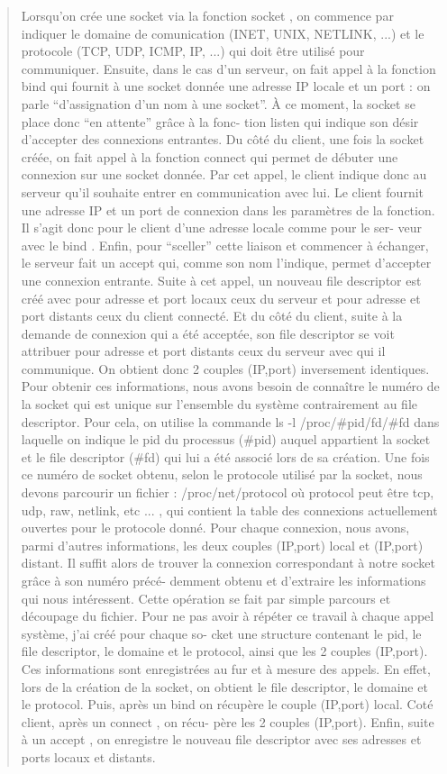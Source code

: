 \documentclass{article}
\begin{document}
\begin{quotation}
{\color{green} Lorsqu’on crée une socket via la fonction socket , on commence
  par indiquer le domaine de comunication (INET, UNIX, NETLINK, ...) et le
  protocole (TCP, UDP, ICMP, IP, ...) qui doit être utilisé pour
  communiquer. Ensuite, dans le cas d’un serveur, on fait appel à la fonction
  bind qui fournit à une socket donnée une adresse IP locale et un port : on
  parle “d’assignation d’un nom à une socket”. À ce moment, la socket se place
  donc “en attente” grâce à la fonc- tion listen qui indique son désir
  d’accepter des connexions entrantes. Du côté du client, une fois la socket
  créée, on fait appel à la fonction connect qui permet de débuter une connexion
  sur une socket donnée. Par cet appel, le client indique donc au serveur qu’il
  souhaite entrer en communication avec lui. Le client fournit une adresse IP et
  un port de connexion dans les paramètres de la fonction. Il s’agit donc pour
  le client d’une adresse locale comme pour le ser- veur avec le bind . Enfin,
  pour “sceller” cette liaison et commencer à échanger, le serveur fait un
  accept qui, comme son nom l’indique, permet d’accepter une connexion
  entrante. Suite à cet appel, un nouveau file descriptor est créé avec pour
  adresse et port locaux ceux du serveur et pour adresse et port distants ceux
  du client connecté. Et du côté du client, suite à la demande de connexion qui
  a été acceptée, son file descriptor se voit attribuer pour adresse et port
  distants ceux du serveur avec qui il communique. On obtient donc 2 couples
  (IP,port) inversement identiques.  Pour obtenir ces informations, nous avons
  besoin de connaître le numéro de la socket qui est unique sur l’ensemble du
  système contrairement au file descriptor. Pour cela, on utilise la commande ls
  -l /proc/\#pid/fd/\#fd dans laquelle on indique le pid du processus (\#pid)
  auquel appartient la socket et le file descriptor (\#fd) qui lui a été associé
  lors de sa création. Une fois ce numéro de socket obtenu, selon le protocole
  utilisé par la socket, nous devons parcourir un fichier : /proc/net/protocol
  où protocol peut être tcp, udp, raw, netlink, etc ... , qui contient la table
  des connexions actuellement ouvertes pour le protocole donné. Pour chaque
  connexion, nous avons, parmi d’autres informations, les deux couples (IP,port)
  local et (IP,port) distant. Il suffit alors de trouver la connexion
  correspondant à notre socket grâce à son numéro précé- demment obtenu et
  d’extraire les informations qui nous intéressent. Cette opération se fait par
  simple parcours et découpage du fichier.  Pour ne pas avoir à répéter ce
  travail à chaque appel système, j’ai créé pour chaque so- cket une structure
  contenant le pid, le file descriptor, le domaine et le protocol, ainsi que les
  2 couples (IP,port). Ces informations sont enregistrées au fur et à mesure des
  appels. En effet, lors de la création de la socket, on obtient le file
  descriptor, le domaine et le protocol. Puis, après un bind on récupère le
  couple (IP,port) local. Coté client, après un connect , on récu- père les 2
  couples (IP,port). Enfin, suite à un accept , on enregistre le nouveau file
  descriptor avec ses adresses et ports locaux et distants. }
\end{quotation}
\end{document}
